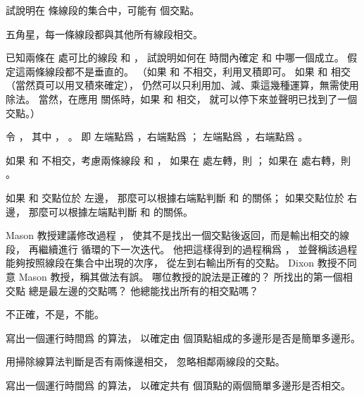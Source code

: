 \startsection[
  title={Determining whether any pair of segments intersects},
]

\startEXERCISE
試說明在  條線段的集合中，可能有  個交點。
\stopEXERCISE

\startANSWER
五角星，每一條線段都與其他所有線段相交。
\stopANSWER

\startEXERCISE[exercise:33.2-2]
已知兩條在  處可比的線段  和 ，
試說明如何在  時間內確定  和  中哪一個成立。
假定這兩條線段都不是垂直的。
（\hint 如果  和  不相交，利用叉積即可。
如果  和  相交（當然頁可以用叉積來確定），
仍然可以只利用加、減、乘這幾種運算，無需使用除法。
當然，在應用  關係時，如果  和  相交，
就可以停下來並聲明已找到了一個交點。）
\stopEXERCISE

\startANSWER
令 ，
其中 ，
 。
即  左端點爲 ，右端點爲 ；
  左端點爲 ，右端點爲 。

如果  和  不相交，考慮兩條線段  和 ，
如果在  處左轉，則 ；
如果在  處右轉，則 。

如果  和  交點位於  左邊，
那麼可以根據右端點判斷  和  的關係；
如果交點位於  右邊，
那麼可以根據左端點判斷  和  的關係。
\stopANSWER

\startEXERCISE
Mason 教授建議修改過程 ，
使其不是找出一個交點後返回，而是輸出相交的線段，
再繼續進行  循環的下一次迭代。
他把這樣得到的過程稱爲 ，
並聲稱該過程能夠按照線段在集合中出現的次序，
從左到右輸出所有的交點。
 Dixon 教授不同意 Mason 教授，稱其做法有誤。
哪位教授的說法是正確的？
  所找出的第一個相交點
總是最左邊的交點嗎？
他總能找出所有的相交點嗎？
\stopEXERCISE

\startANSWER
不正確，不是，不能。
\stopANSWER

\startEXERCISE
寫出一個運行時間爲  的算法，
以確定由  個頂點組成的多邊形是否是簡單多邊形。
\stopEXERCISE

\startANSWER
用掃除線算法判斷是否有兩條邊相交，
忽略相鄰兩線段的交點。
\stopANSWER

\startEXERCISE
寫出一個運行時間爲  的算法，
以確定共有  個頂點的兩個簡單多邊形是否相交。
\stopEXERCISE


